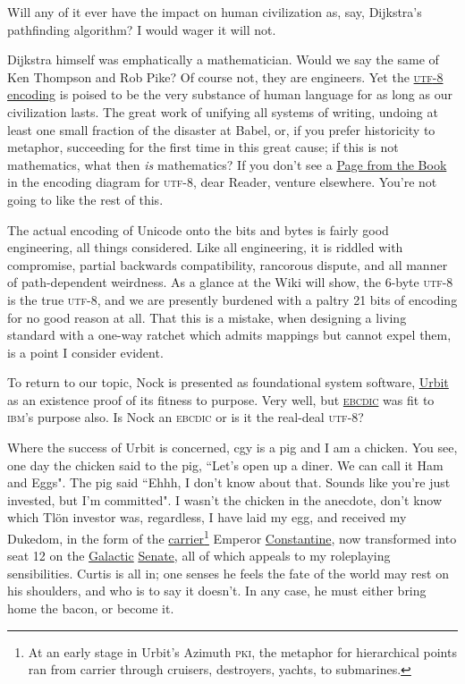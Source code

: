 \documentclass[twoside]{article}
\begin{document}
Will any of it ever have the impact on human civilization as, say, Dijkstra's pathfinding algorithm? I would wager it will not.

Dijkstra himself was emphatically a mathematician. Would we say the same of Ken Thompson and Rob Pike? Of course not, they are engineers. Yet the \href{https://en.wikipedia.org/wiki/UTF-8#History}{\textsc{utf}-8 encoding} is poised to be the very substance of human language for as long as our civilization lasts. The great work of unifying all systems of writing, undoing at least one small fraction of the disaster at Babel, or, if you prefer historicity to metaphor, succeeding for the first time in this great cause; if this is not mathematics, what then \emph{is} mathematics? If you don't see a \href{https://en.wikipedia.org/wiki/Erdős_Pál}{Page from the Book} in the encoding diagram for \textsc{utf}-8, dear Reader, venture elsewhere. You're not going to like the rest of this.

The actual encoding of Unicode onto the bits and bytes is fairly good engineering, all things considered. Like all engineering, it is riddled with compromise, partial backwards compatibility, rancorous dispute, and all manner of path-dependent weirdness. As a glance at the Wiki will show, the 6-byte \textsc{utf}-8 is the true \textsc{utf}-8, and we are presently burdened with a paltry 21 bits of encoding for no good reason at all. That this is a mistake, when designing a living standard with a one-way ratchet which admits mappings but cannot expel them, is a point I consider evident.

To return to our topic, Nock is presented as foundational system software, \href{https://urbit.org}{Urbit} as an existence proof of its fitness to purpose. Very well, but \href{https://en.wikipedia.org/wiki/EBCDIC}{\textsc{ebcdic}} was fit to \textsc{ibm}'s purpose also. Is Nock an \textsc{ebcdic} or is it the real-deal \textsc{utf}-8?

Where the success of Urbit is concerned, cgy is a pig and I am a chicken. You see, one day the chicken said to the pig, ``Let's open up a diner. We can call it Ham and Eggs". The pig said ``Ehhh, I don't know about that. Sounds like you're just invested, but I'm committed". I wasn't the chicken in the anecdote, don't know which Tlön investor was, regardless, I have laid my egg, and received my Dukedom, in the form of the \href{https://en.wikipedia.org/wiki/Aircraft_carrier}{carrier}\footnote{At an early stage in Urbit's Azimuth \textsc{pki}, the metaphor for hierarchical points ran from carrier through cruisers, destroyers, yachts, to submarines.} Emperor \href{https://en.wikipedia.org/wiki/Constantine_(disambiguation)}{Constantine}, now transformed into seat 12 on the \href{https://urbit.org/~~/posts/constitution/}{Galactic} \href{https://en.wikipedia.org/wiki/Roman_Senate}{Senate}, all of which appeals to my roleplaying sensibilities. Curtis is all in; one senses he feels the fate of the world may rest on his shoulders, and who is to say it doesn't. In any case, he must either bring home the bacon, or become it.
\end{document}
